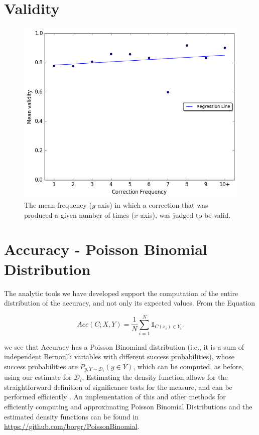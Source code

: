 \documentclass[letterpaper, 11pt]{article}
\newenvironment{myequation}{
  \vspace{-1em}
 \begin{equation}
}{
 \end{equation}
 \vspace{-1.2em}
}
\begin{document}
\section{Validity}\label{ap:validity_judgements}
\begin{figure}[h!]
	\vspace{-.3cm}
	\includegraphics[width=0.9\columnwidth]{IAA_confirmation_frequency}
	\caption{The mean frequency ($y$-axis) in which a correction that was produced
		a given number of times ($x$-axis), was judged to be valid.
		\label{fig:validity_judgements}}
	\vspace{-0.3cm}
\end{figure}
\FloatBarrier

\section{Accuracy - Poisson Binomial Distribution}\label{ap:poibin}
The analytic tools we have developed support the computation of the entire distribution of the accuracy, and not only its expected values. From the Equation 
	
	\begin{myequation}
		Acc\left(C;X,Y\right) = \frac{1}{N} \sum_{i=1}^N \mathds{1}_{C(x_i) \in Y_i}.
	\end{myequation}
	
\noindent
 we see that Accuracy has a Poisson Binominal distribution (i.e., it is a sum of independent Bernoulli variables with different success probabilities), whose success probabilities are $P_{y,Y \sim \mathcal{D}_i}(y \in Y)$, which can be computed, as before, using our estimate for $\mathcal{D}_i$. Estimating the density function allows for the straightforward definition of significance tests for the measure, and can be performed efficiently \cite{hong2013computing}. An implementation of this and other methods for efficiently computing and approximating Poisson Binomial Distributions and the estimated density functions can be found in \url{https://github.com/borgr/PoissonBinomial}.
\end{document}
